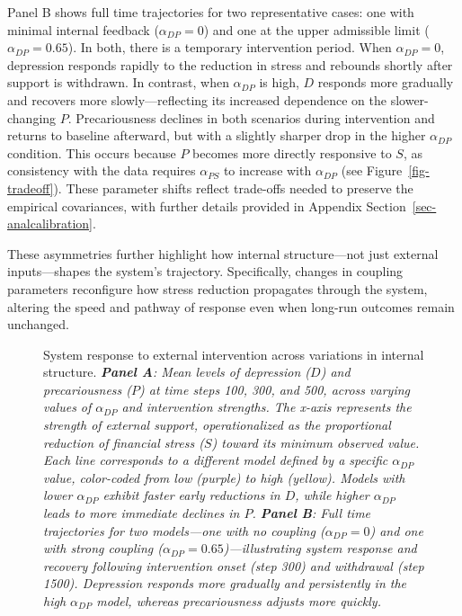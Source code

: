 \documentclass[
]{article}
\begin{document}
Panel B shows full time trajectories for two representative cases: one
with minimal internal feedback (\(\alpha_{DP} = 0\)) and one at the
upper admissible limit (\(\alpha_{DP} = 0.65\)). In both, there is a
temporary intervention period. When \(\alpha_{DP} = 0\), depression
responds rapidly to the reduction in stress and rebounds shortly after
support is withdrawn. In contrast, when \(\alpha_{DP}\) is high, \(D\)
responds more gradually and recovers more slowly---reflecting its
increased dependence on the slower-changing \(P\). Precariousness
declines in both scenarios during intervention and returns to baseline
afterward, but with a slightly sharper drop in the higher
\(\alpha_{DP}\) condition. This occurs because \(P\) becomes more
directly responsive to \(S\), as consistency with the data requires
\(\alpha_{PS}\) to increase with \(\alpha_{DP}\) (see
Figure~\ref{fig-tradeoff}). These parameter shifts reflect trade-offs
needed to preserve the empirical covariances, with further details
provided in Appendix Section~\ref{sec-analcalibration}.

These asymmetries further highlight how internal structure---not just
external inputs---shapes the system's trajectory. Specifically, changes
in coupling parameters reconfigure how stress reduction propagates
through the system, altering the speed and pathway of response even when
long-run outcomes remain unchanged.


\begin{figure}


\caption{\label{fig-intervention}System response to external
intervention across variations in internal structure.
\emph{\textbf{Panel A}: Mean levels of depression (\(D\)) and
precariousness (\(P\)) at time steps 100, 300, and 500, across varying
values of \(\alpha_{DP}\) and intervention strengths. The x-axis
represents the strength of external support, operationalized as the
proportional reduction of financial stress (\(S\)) toward its minimum
observed value. Each line corresponds to a different model defined by a
specific \(\alpha_{DP}\) value, color-coded from low (purple) to high
(yellow). Models with lower \(\alpha_{DP}\) exhibit faster early
reductions in \(D\), while higher \(\alpha_{DP}\) leads to more
immediate declines in \(P\). \textbf{Panel B}: Full time trajectories
for two models---one with no coupling (\(\alpha_{DP} = 0\)) and one with
strong coupling (\(\alpha_{DP} = 0.65\))---illustrating system response
and recovery following intervention onset (step 300) and withdrawal
(step 1500). Depression responds more gradually and persistently in the
high \(\alpha_{DP}\) model, whereas precariousness adjusts more
quickly.}}

\end{figure}%
\end{document}
